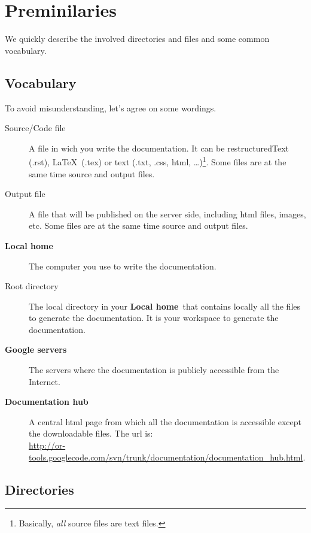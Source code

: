 \documentclass[a4paper,10pt]{article}
\newcommand{\gservers}{{\bf Google servers}}
\newcommand{\lhome}{{\bf Local home}}
\newcommand{\dhub}{{\bf Documentation hub}}
\begin{document}
\setcounter{tocdepth}{2}
\tableofcontents


\section{Preminilaries}
We quickly describe the involved directories and files and some common vocabulary.

\subsection{Vocabulary}

To avoid misunderstanding, let's agree on some wordings.

\begin{description}
 \item[Source/Code file] A file in wich you write the documentation. It can be restructuredText (.rst), \LaTeX\ (.tex) or text (.txt, .css, html, \ldots)\footnote{Basically, \emph{all} source files are text files.}. Some files are at the same time source and output files.
 \item[Output file] A file that will be published on the server side, including html files, images, etc. Some files are at the same time source and output files.
 \item[\lhome] The computer you use to write the documentation.
\item[Root directory] The local directory in your \lhome\ that contains locally all the files to generate the documentation. It is your workspace to generate the documentation.
 \item[\gservers] The servers where the documentation is publicly accessible from the Internet.
 \item[\dhub] A central html page from which all the documentation is accessible except the downloadable files. The url is:\\
 \href{http://or-tools.googlecode.com/svn/trunk/documentation/documentation\_hub.html}{http://or-tools.googlecode.com/svn/trunk/documentation/documentation\_hub.html}.
\end{description}

\subsection{Directories}
\end{document}
